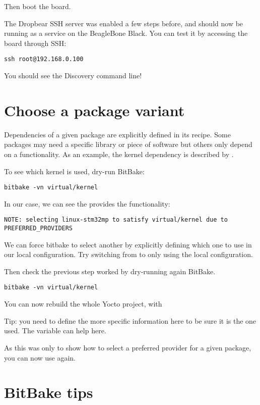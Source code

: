 Then boot the board.

The Dropbear SSH server was enabled a few steps before, and should now be
running as a service on the BeagleBone Black. You can test it by accessing the
board through SSH:
\begin{verbatim}
ssh root@192.168.0.100
\end{verbatim}

You should see the Discovery command line!

\section{Choose a package variant}

Dependencies of a given package are explicitly defined in its recipe.
Some packages may need a specific library or piece of software but
others only depend on a functionality. As an example, the kernel
dependency is described by .

To see which kernel is used, dry-run BitBake:
\begin{verbatim}
bitbake -vn virtual/kernel
\end{verbatim}

In our case, we can see the  provides the
 functionality:
\small
\begin{verbatim}
NOTE: selecting linux-stm32mp to satisfy virtual/kernel due to PREFERRED_PROVIDERS
\end{verbatim}
\normalsize

We can force bitbake to select another  by explicitly
defining which one to use in our local configuration. Try switching
from  to  only using the
local configuration.

Then check the previous step worked by dry-running again BitBake.
\begin{verbatim}
bitbake -vn virtual/kernel
\end{verbatim}

You can now rebuild the whole Yocto project, with 

Tip: you need to define the more specific information here to be sure it is the
one used. The  variable can help here.

As this was only to show how to select a preferred provider for a
given package, you can now use  again.

\section{BitBake tips}

